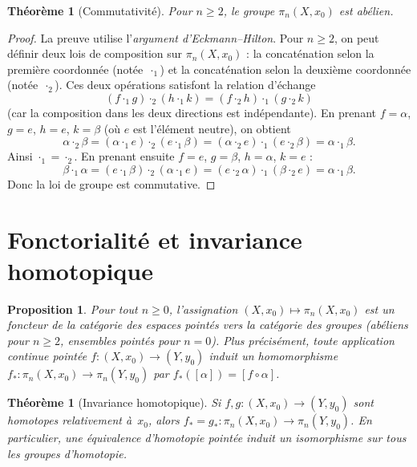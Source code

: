 \documentclass[12pt,a4paper,openany]{book}
\theoremstyle{definition}
\theoremstyle{plain}
\newtheorem{theoreme}[definition]{Théorème}
\newtheorem{proposition}[definition]{Proposition}
\theoremstyle{remark}
\begin{document}
\begin{theoreme}[Commutativité]\label{thm:pi-n-abelien}
  Pour $n \geq 2$, le groupe $\pi_n(X, x_0)$ est abélien.
\end{theoreme}

\begin{proof}
  La preuve utilise l'\emph{argument d'Eckmann--Hilton}.
  Pour $n \geq 2$, on peut définir deux lois de composition sur $\pi_n(X, x_0)$ :
  la concaténation selon la première coordonnée (notée~$\cdot_1$) et la concaténation
  selon la deuxième coordonnée (notée~$\cdot_2$). Ces deux opérations satisfont la
  relation d'échange
  \[
    (f \cdot_1 g) \cdot_2 (h \cdot_1 k) = (f \cdot_2 h) \cdot_1 (g \cdot_2 k)
  \]
  (car la composition dans les deux directions est indépendante). En prenant
  $f = \alpha$, $g = e$, $h = e$, $k = \beta$ (où $e$ est l'élément neutre), on
  obtient
  \[
    \alpha \cdot_2 \beta = (\alpha \cdot_1 e) \cdot_2 (e \cdot_1 \beta)
    = (\alpha \cdot_2 e) \cdot_1 (e \cdot_2 \beta)
    = \alpha \cdot_1 \beta.
  \]
  Ainsi $\cdot_1 = \cdot_2$. En prenant ensuite $f = e$, $g = \beta$,
  $h = \alpha$, $k = e$ :
  \[
    \beta \cdot_1 \alpha = (e \cdot_1 \beta) \cdot_2 (\alpha \cdot_1 e)
    = (e \cdot_2 \alpha) \cdot_1 (\beta \cdot_2 e)
    = \alpha \cdot_1 \beta.
  \]
  Donc la loi de groupe est commutative.
\end{proof}

\section{Fonctorialité et invariance homotopique}\label{sec:fonctorialite-pi}

\begin{proposition}\label{prop:pi-n-fonctoriel}
  Pour tout $n \geq 0$, l'assignation $(X, x_0) \mapsto \pi_n(X, x_0)$ est un
  foncteur de la catégorie des espaces pointés vers la catégorie des groupes (abéliens
  pour $n \geq 2$, ensembles pointés pour $n = 0$). Plus précisément, toute
  application continue pointée $f \colon (X, x_0) \to (Y, y_0)$ induit un
  homomorphisme $f_* \colon \pi_n(X, x_0) \to \pi_n(Y, y_0)$ par
  $f_*([\alpha]) = [f \circ \alpha]$.
\end{proposition}

\begin{theoreme}[Invariance homotopique]\label{thm:pi-n-inv-homo}
  Si $f, g \colon (X, x_0) \to (Y, y_0)$ sont homotopes relativement à~$x_0$,
  alors $f_* = g_* \colon \pi_n(X, x_0) \to \pi_n(Y, y_0)$. En particulier, une
  équivalence d'homotopie pointée induit un isomorphisme sur tous les groupes
  d'homotopie.
\end{theoreme}
\end{document}

